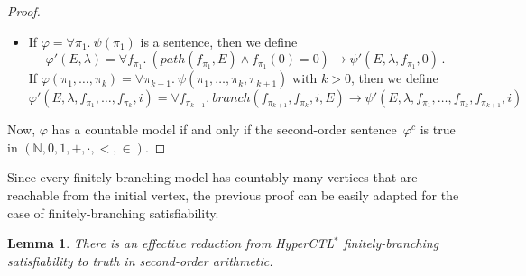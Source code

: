 \documentclass[dvipsnames,10pt,a4paper]{amsart}
\newtheorem{lem}[thm]{Lemma}
\theoremstyle{definition}
\theoremstyle{remark}
\newcommand{\nats}{\mathbb{N}}
\renewcommand{\phi}{\varphi}
\newcommand{\hyctlstar}{{HyperCTL$^*$}\xspace}
\renewcommand{\phi}{\varphi}
\newcommand\phicount{\phi^{\mathit{c}}}
\begin{document}
\begin{proof}
\begin{itemize}
    If $\phi(\pi_1,\ldots,\pi_k) = \exists \pi_{k+1}.\ \psi(\pi_1,\ldots,\pi_k,\pi_{k+1})$
    with $k > 0$, then we define
    \[
      \phi'(E,\lambda,f_{\pi_1},\ldots,f_{\pi_k},i) = 
        \exists f_{\pi_{k+1}}.\  \mathit{branch}(f_{\pi_{k+1}},f_{\pi_k},i,E) \land
        \psi'(E,\lambda,f_{\pi_1},\ldots,f_{\pi_k},f_{\pi_{k+1}},i) \, .
      \]
      Here, we make use of the ordering of the free variables of $\phi$, as the translated formula requires the function assigned to $f_{\pi_{k+1}}$ to encode a path branching of the path encoded by the function assigned to $f_{\pi_{k}}$.
      

    \item
      If $\phi = \forall \pi_1.\ \psi(\pi_1)$ is a sentence, then we define
      \[
        \phi'(E,\lambda) = \forall f_{\pi_1}.\
        \left(\mathit{path}(f_{\pi_1},E) \land f_{\pi_1}(0) = 0 \right) \rightarrow
        \psi'(E,\lambda,f_{\pi_1},0) \, .
      \]
      If $\phi(\pi_1,\ldots,\pi_k) = \forall \pi_{k+1}.\ \psi(\pi_1,\ldots,\pi_k,\pi_{k+1})$
      with $k > 0$,  then we define
    \[
      \phi'(E,\lambda,f_{\pi_1},\ldots,f_{\pi_k},i) = 
        \forall f_{\pi_{k+1}}.\  \mathit{branch}(f_{\pi_{k+1}},f_{\pi_k},i,E) \rightarrow
        \psi'(E,\lambda,f_{\pi_1},\ldots,f_{\pi_k},f_{\pi_{k+1}},i)
      \]
  \end{itemize}
  
Now, $\phi$ has a countable model if and only if the second-order sentence~$\phicount$ is true in $(\nats,0,1,+,\cdot,<,\in)$.
\end{proof}

Since every finitely-branching model has countably many vertices that are reachable from the initial vertex, the previous proof can
be easily adapted for the case of finitely-branching satisfiability.

\begin{lem}\label{lem:hyctlvars:finbranch}
There is an effective reduction from \hyctlstar finitely-branching
  satisfiability to truth in second-order arithmetic.
\end{lem}
\end{document}
